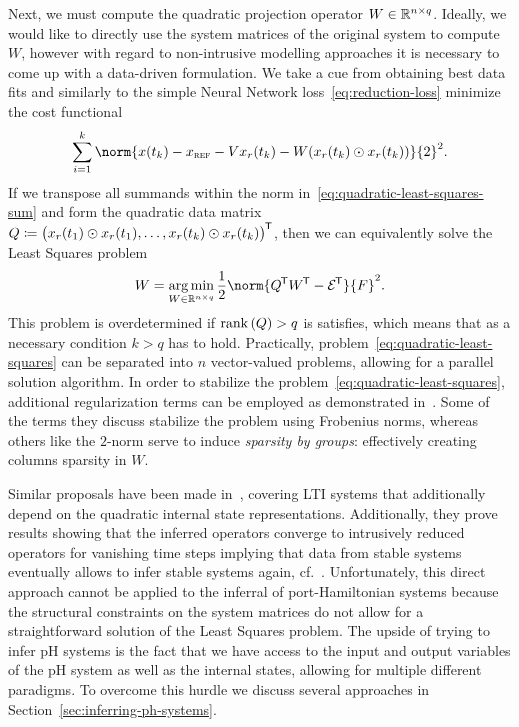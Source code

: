 Next, we must compute the quadratic projection operator $W \in \mathbb{R}^{n \times q}$.
Ideally, we would like to directly use the system matrices of the original system to compute $W$, however with regard to non-intrusive modelling approaches it is necessary to come up with a data-driven formulation.
We take a cue from obtaining best data fits and similarly to the simple Neural Network loss~\eqref{eq:reduction-loss} minimize the cost functional
\begin{equation}\label{eq:quadratic-least-squares-sum}
    \sum\limits_{i = 1}^k \norm{x(t_k) - x_\msc{ref} - V x_r(t_k) - W (x_r(t_k) \odot x_r(t_k))}{2}^2.
\end{equation}
If we transpose all summands within the norm in~\eqref{eq:quadratic-least-squares-sum} and form the quadratic data matrix $Q \coloneqq {\big( x_r(t_1) \odot x_r(t_1), \dots, x_r(t_k) \odot x_r(t_k) \big)}^{\mkern-1.5mu \mathsf{T}}$, then we can equivalently solve the Least Squares problem
\begin{equation}\label{eq:quadratic-least-squares}
    W = \argmin\limits_{W \in \bb{R}^{n \times q}} \frac{1}{2} \norm{Q\trans W\trans - \mcl{E}\trans}{F}^2.
\end{equation}
This problem is overdetermined if $\mathop{}\!\mathrm{rank}\left(Q\right) > q$ is satisfies, which means that as a necessary condition $k > q$ has to hold.
Practically, problem~\eqref{eq:quadratic-least-squares} can be separated into $n$ vector-valued problems, allowing for a parallel solution algorithm.
In order to stabilize the problem~\eqref{eq:quadratic-least-squares}, additional regularization terms can be employed as demonstrated in~\cite[Equation~15]{Geelen2023}.
Some of the terms they discuss stabilize the problem using Frobenius norms, whereas others like the $2$-norm serve to induce \emph{sparsity by groups}: effectively creating columns sparsity in $W$.

Similar proposals have been made in~\cite{Peherstorfer2016}, covering LTI systems that additionally depend on the quadratic internal state representations.
Additionally, they prove results showing that the inferred operators converge to intrusively reduced operators for vanishing time steps implying that data from stable systems eventually allows to infer stable systems again, cf.~\cite[Theorem~1, Corollary~1]{Peherstorfer2016}.
Unfortunately, this direct approach cannot be applied to the inferral of port-Hamiltonian systems because the structural constraints on the system matrices do not allow for a straightforward solution of the Least Squares problem.
The upside of trying to infer pH systems is the fact that we have access to the input and output variables of the pH system as well as the internal states, allowing for multiple different paradigms.
To overcome this hurdle we discuss several approaches in Section~\ref{sec:inferring-ph-systems}.
